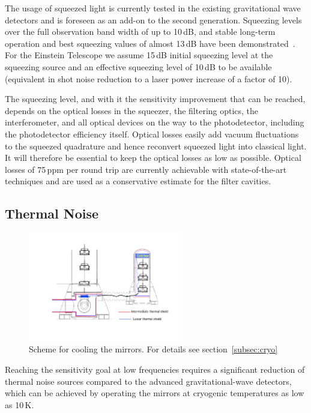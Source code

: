 The usage of squeezed light is currently tested in the existing gravitational wave 
detectors and is foreseen as an add-on to the second generation. Squeezing 
levels over the full observation band width of up to 10\,dB, and stable long-term 
operation and best squeezing values of almost 13\,dB have been demonstrated~\cite{Eberle2010}. 
For the Einstein Telescope we assume 15\,dB initial squeezing 
level at the squeezing source and an effective squeezing level of 10\,dB to be 
available (equivalent in shot noise reduction to a laser power increase of a factor
of 10). 

The squeezing level, and with it the sensitivity improvement that can be reached, 
depends on the optical losses in the squeezer, the filtering optics, the interferometer, 
and all optical devices on the way to the photodetector, including the photodetector 
efficiency itself. Optical losses easily add vacuum fluctuations to the squeezed quadrature 
and hence reconvert squeezed light into classical light. It will therefore be essential 
to keep the optical losses as low as possible. Optical losses of 75\,ppm per round 
trip are currently achievable with state-of-the-art techniques and are used as a 
conservative estimate for the filter cavities.

\subsection{Thermal Noise}
\begin{figure}
\vskip -0.6cm
	\centering
		\includegraphics[width=0.6\textwidth]{./Intro/Intro_Figures/ET_main-cryostat.pdf}
	\caption{Scheme for cooling the mirrors. For details see section~\ref{subsec:cryo}}
\vskip -0.1cm
\end{figure} 

Reaching the sensitivity goal at low frequencies requires a significant reduction 
of thermal noise sources compared to the advanced gravitational-wave 
detectors, which can be achieved by operating the mirrors at cryogenic temperatures 
as low as 10\,K.  

